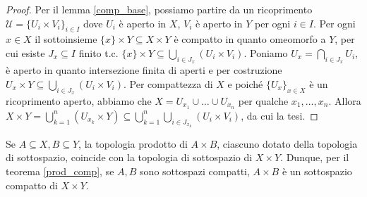 \begin{proof}
  Per il lemma \ref{comp_base}, possiamo partire da un ricoprimento $\mathcal{U}=\{U_i \times V_i\}_{i \in I}$ dove $U_i$ è aperto in $X$, $V_i$ è aperto in $Y$ per ogni $i \in I$.
  Per ogni $x \in X$ il sottoinsieme $\{x\} \times Y \subseteq X \times Y$ è compatto in quanto omeomorfo a $Y$, per cui esiste $J_x \subseteq I$ finito t.c. $\displaystyle \{x\} \times Y \subseteq \bigcup_{i \in J_x} (U_i \times V_i)$. Poniamo $\displaystyle U_x= \bigcap_{i \in J_x} U_i$, è aperto in quanto intersezione finita di aperti e per costruzione
  $\displaystyle U_x \times Y \subseteq \bigcup_{i \in J_x} (U_i \times V_i)$. Per compattezza di $X$ e poiché $\{U_x\}_{x \in X}$ è un ricoprimento aperto, abbiamo che $X=U_{x_1} \cup \dots \cup U_{x_n}$ per qualche $x_1, \dots, x_n$.
  Allora $\displaystyle X \times Y=\bigcup_{k=1}^n (U_{x_k} \times Y) \subseteq \bigcup_{k=1}^n \bigcup_{i \in J_{x_k}} (U_i \times V_i)$, da cui la tesi.
\end{proof}

\begin{oss}
  Se $A \subseteq X, B \subseteq Y$, la topologia prodotto di $A \times B$, ciascuno dotato della topologia di sottospazio, coincide con la topologia di sottospazio di $X \times Y$. Dunque, per il teorema \ref{prod_comp}, se $A, B$ sono sottospazi compatti, $A \times B$ è un sottospazio compatto di $X \times Y$.
\end{oss}
